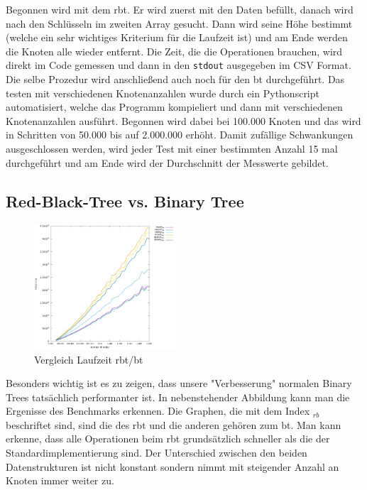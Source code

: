 \documentclass[11pt]{article}
\newcommand{\lstin}[1]{\lstinline[language=C]{#1}}
\begin{document}
Begonnen wird mit dem \gls{rbt}. Er wird zuerst mit den Daten befüllt, danach wird nach den Schlüsseln im zweiten Array gesucht. Dann wird seine Höhe bestimmt (welche ein sehr wichtiges Kriterium für die Laufzeit ist) und am Ende werden die Knoten alle wieder entfernt.  
Die Zeit, die die Operationen brauchen, wird direkt im Code gemessen und dann in den \lstin{stdout} ausgegeben im CSV Format. Die selbe Prozedur wird anschließend auch noch für den \gls{bt} durchgeführt.
Das testen mit verschiedenen Knotenanzahlen wurde durch ein Pythonscript automatisiert, welche das Programm kompieliert und dann mit verschiedenen Knotenanzahlen ausführt. 
Begonnen wird dabei bei 100.000 Knoten und das wird in Schritten von 50.000 bis auf 2.000.000 erhöht. Damit zufällige Schwankungen ausgeschlossen werden, wird jeder Test mit einer bestimmten Anzahl 
15 mal durchgeführt und am Ende wird der Durchschnitt der Messwerte gebildet. 

\subsection{Red-Black-Tree vs. Binary Tree} \label{bbrbt}

\begin{figure}
  \includegraphics[width=200px]{../benchmark/compare_bin.png}
  \vspace{-20pt}
  \caption{Vergleich Laufzeit \gls{rbt}/\gls{bt}}
  \vspace{-15pt}
\end{figure}

Besonders wichtig ist es zu zeigen, dass unsere "Verbesserung" normalen Binary Trees tatsächlich performanter ist. In nebenstehender Abbildung kann man die Ergenisse des Benchmarks erkennen.
Die Graphen, die mit dem Index $_{rb}$ beschriftet sind, sind die des \gls{rbt} und die anderen gehören zum \gls{bt}.
Man kann erkenne, dass alle Operationen beim \gls{rbt} grundsätzlich schneller als die der Standardimplementierung sind. 
Der Unterschied zwischen den beiden Datenstrukturen ist nicht konstant sondern nimmt mit steigender Anzahl an Knoten immer weiter zu. 
\end{document}
